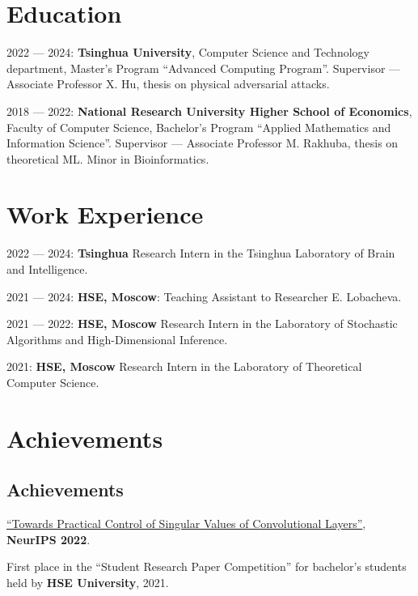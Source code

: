 
\begin{resume}

  \section*{Education}

  2022 --- 2024: \textbf{Tsinghua University}, Computer Science and Technology department, Master’s Program ``Advanced Computing Program''.
  Supervisor --- Associate Professor X. Hu, thesis on physical adversarial attacks.

  2018 --- 2022: \textbf{National Research University Higher School of Economics}, Faculty of Computer Science, Bachelor’s Program ``Applied Mathematics and Information Science''.
  Supervisor --- Associate Professor M. Rakhuba, thesis on theoretical ML. 
  Minor in Bioinformatics.

  \section*{Work Experience}
  2022 --- 2024: \textbf{Tsinghua} Research Intern in the Tsinghua Laboratory of Brain and Intelligence.

  2021 --- 2024: \textbf{HSE, Moscow}: Teaching Assistant to Researcher E. Lobacheva.
  
  2021 --- 2022: \textbf{HSE, Moscow} Research Intern in the Laboratory of Stochastic Algorithms and High-Dimensional Inference.
  
  2021: \textbf{HSE, Moscow} Research Intern in the Laboratory of Theoretical Computer Science.

  \section*{Achievements}

  \subsection*{Achievements}

  \begin{achievements}
    \item \href{https://openreview.net/forum?id=T5TtjbhlAZH}{``Towards Practical Control of Singular Values of Convolutional Layers''}, \textbf{NeurIPS 2022}.
    \item First place in the ``Student Research Paper Competition'' for bachelor's students held by \textbf{HSE University}, 2021.
  \end{achievements}


\end{resume}
